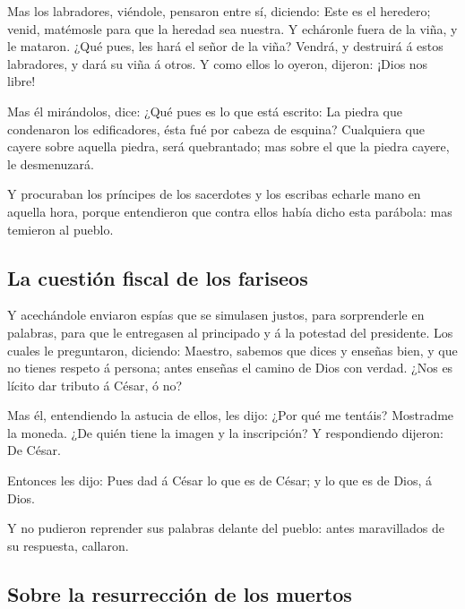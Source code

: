 Mas los labradores, viéndole, pensaron entre sí,
diciendo: Este es el heredero; venid, matémosle para que la heredad sea
nuestra.  Y echáronle fuera de la viña, y le mataron.
¿Qué pues, les hará el señor de la viña?  Vendrá, y
destruirá á estos labradores, y dará su viña á otros. Y como ellos lo
oyeron, dijeron: ¡Dios nos libre!

 Mas él mirándolos, dice: ¿Qué pues es lo que está
escrito: La piedra que condenaron los edificadores, ésta fué por cabeza
de esquina?  Cualquiera que cayere sobre aquella piedra,
será quebrantado; mas sobre el que la piedra cayere, le desmenuzará.

 Y procuraban los príncipes de los sacerdotes y los
escribas echarle mano en aquella hora, porque entendieron que contra
ellos había dicho esta parábola: mas temieron al pueblo.

\hypertarget{la-cuestiuxf3n-fiscal-de-los-fariseos}{%
\subsection{La cuestión fiscal de los
fariseos}\label{la-cuestiuxf3n-fiscal-de-los-fariseos}}

 Y acechándole enviaron espías que se simulasen justos,
para sorprenderle en palabras, para que le entregasen al principado y á
la potestad del presidente.  Los cuales le preguntaron,
diciendo: Maestro, sabemos que dices y enseñas bien, y que no tienes
respeto á persona; antes enseñas el camino de Dios con verdad.
 ¿Nos es lícito dar tributo á César, ó no?

 Mas él, entendiendo la astucia de ellos, les dijo: ¿Por
qué me tentáis?  Mostradme la moneda. ¿De quién tiene la
imagen y la inscripción? Y respondiendo dijeron: De César.

 Entonces les dijo: Pues dad á César lo que es de César;
y lo que es de Dios, á Dios.

 Y no pudieron reprender sus palabras delante del pueblo:
antes maravillados de su respuesta, callaron.

\hypertarget{sobre-la-resurrecciuxf3n-de-los-muertos}{%
\subsection{Sobre la resurrección de los
muertos}\label{sobre-la-resurrecciuxf3n-de-los-muertos}}

